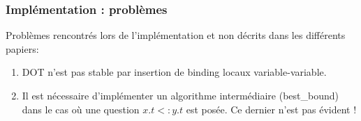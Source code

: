 \documentclass{beamer}
\begin{document}
\begin{frame}
  \frametitle{Implémentation : problèmes}
  Problèmes rencontrés lors de l'implémentation et non décrits dans les
  différents papiers:
  \begin{enumerate}
  \item DOT n'est pas stable par insertion de binding locaux variable-variable.
  \item Il est nécessaire d'implémenter un algorithme intermédiaire
    (best\_bound) dans le cas où une question $x.t <: y.t$ est posée. Ce dernier
    n'est pas évident !
  \end{enumerate}
\end{frame}

%
%
%
%
%
\end{document}

